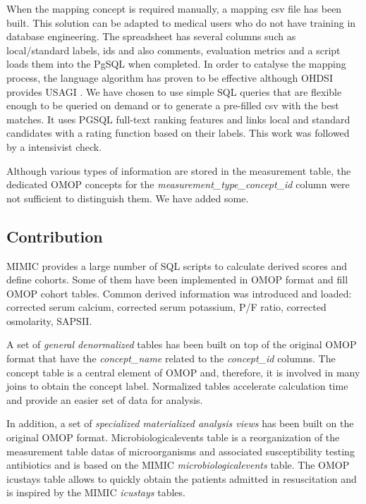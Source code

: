 When the mapping concept is required manually, a mapping csv file has been built. 
This solution can be adapted to medical users who do not have training in 
database engineering. The spreadsheet has several columns such as local/standard 
labels, ids and also comments, evaluation metrics and a script loads them into 
the PgSQL when completed. 
In order to catalyse the mapping process, the language algorithm has proven to 
be effective \cite{schema-matching} although OHDSI provides USAGI \cite{usagi}. We 
have chosen to use simple SQL queries that are flexible enough to be queried on 
demand or to generate a pre-filled csv with the best matches. It uses PGSQL 
full-text ranking features  and links local and standard candidates with a rating 
function based on their labels. This work was followed by a intensivist check.

Although various types of information are stored in the measurement table, the
dedicated OMOP concepts for the \textit{measurement\_type\_concept\_id} column
were not sufficient to distinguish them. We have added some. 

%
%
\subsection{Contribution}

MIMIC provides a large number of SQL scripts to calculate derived scores and 
define cohorts. Some of them have been implemented in OMOP format and fill OMOP 
cohort tables. Common derived information was introduced and loaded: 
corrected serum calcium, corrected serum potassium, P/F ratio, corrected osmolarity, 
SAPSII.

A set of \emph{general denormalized} tables has been built on top of the original 
OMOP  format that have the \textit{concept\_name} related to the \textit{concept\_id} 
columns. The concept table is a central element of OMOP and, therefore, it is 
involved in many joins to obtain the concept label. Normalized tables accelerate 
calculation time and provide an easier set of data for analysis.

In addition, a set of \emph{specialized materialized analysis views} has been built 
on the original OMOP format. Microbiologicalevents table is a reorganization of the 
measurement table datas of microorganisms and associated susceptibility testing 
antibiotics and is based on the MIMIC \textit{microbiologicalevents} table. 
The OMOP icustays table allows to quickly obtain the patients admitted in 
resuscitation and is inspired by the MIMIC \textit{icustays} tables.

